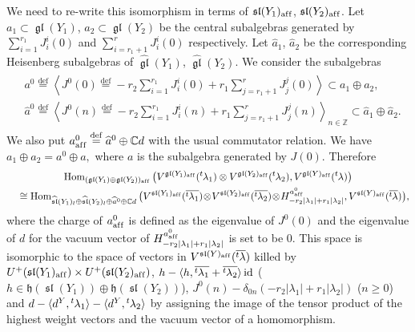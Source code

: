\documentclass[pdftex]{sigma}
\theoremstyle{definition}
\numberwithin{equation}{section}
\newcommand{\lsp}[2]{{\mskip-.3mu}{}^{#1}\mskip-1mu{#2}}
\newcommand{\defeq}{\overset{\operatorname{\scriptstyle def}}{=}}
\newcommand{\C}{{\mathbb C}}
\newcommand{\Z}{{\mathbb Z}}
\newcommand{\algsl}{\operatorname{\mathfrak{sl}}} %
\newcommand{\gl}{\operatorname{\mathfrak{gl}}}
\newcommand{\Hom}{\operatorname{Hom}}
\newcommand{\id}{\operatorname{id}}
\newcommand{\aff}{\mathrm{af\/f}}
\begin{document}
We need to re-write this isomorphism in terms of $\algsl(Y_1)_\aff$,
$\algsl(Y_2)_\aff$.
%
Let ${a}_1\subset{\gl}(Y_1)$, ${a}_2\subset{\gl}(Y_2)$ be the
central subalgebras generated by
\(
   \sum_{i=1}^{r_1} J_i^i(0)
\)
and
\(
   \sum_{i=r_1+1}^{r} J_i^i(0)
\)
respectively. Let $\widehat{a}_1$, $\widehat{a}_2$ be the
corresponding Heisenberg subalgebras of
$\widehat{\gl}(Y_1)$, $\widehat{\gl}(Y_2)$.
%
We consider the subalgebras
{\allowdisplaybreaks
\begin{gather*}
\begin{split}
  & {a}^0   \defeq
  \left\langle J^0(0) \defeq - r_2 \sum_{i=1}^{r_1} J_i^i(0)
   + r_1 \sum_{j=r_1+1}^{r} J_j^j(0)\right\rangle
  \subset
  {a}_1\oplus {a}_2,
\\
 & \widehat{a}^0  \defeq
  \left\langle J^0(n) \defeq - r_2 \sum_{i=1}^{r_1} J_i^i(n)
   + r_1 \sum_{j=r_1+1}^{r} J_j^j(n) \right\rangle_{n\in\Z}
  \subset
  \widehat{a}_1\oplus \widehat{a}_2.
\end{split}
\end{gather*}
We} also put $a^0_\aff \defeq \widehat a^0\oplus \C d$ with the usual
commutator relation.
%
We have
\(
  {a}_1\oplus {a}_2 = {a}^0 \oplus {a},
\)
where $a$ is the subalgebra generated by $J(0)$.
%
Therefore
\begin{gather}\label{eq:homsp}
     \Hom_{({\gl}(Y_1)\oplus{\gl}(Y_2))_\aff}
  \big(V^{{\gl}(Y_1)_\aff}(\lsp{t}\lambda_1)
  \otimes V^{{\gl}(Y_2)_\aff}(\lsp{t}\lambda_2),
  V^{{\gl}(Y)_\aff}(\lsp{t}\lambda)\big)
\\
 \quad{} \cong
  \Hom_{\widehat{\algsl}(Y_1)_l\oplus\widehat{\algsl}(Y_2)_l\oplus
    \widehat{a}^0 \oplus \C d}
  \big(V^{{\algsl}(Y_1)_\aff}(\overline{\lsp{t}\lambda_1})
  \!\otimes\! V^{{\algsl}(Y_2)_\aff}(\overline{\lsp{t}\lambda_2})
  \!\otimes\! H^{{a}^0_\aff}_{-r_2|\lambda_1|+r_1|\lambda_2|},
  V^{{\algsl}(Y)_\aff}(\overline{\lsp{t}\lambda})\big),
\nonumber
\end{gather}
where the charge of ${a}^0_\aff$ is def\/ined as the eigenvalue of
\(
  J^0(0)
\)
and the eigenvalue of $d$ for the vacuum vector of
$H^{{a}^0_\aff}_{-r_2|\lambda_1|+r_1|\lambda_2|}$ is set to be $0$.
%
This space is isomorphic to the space of vectors in
$V^{\algsl(Y)_\aff}(\overline{\lsp{t}\lambda})$ killed by
$U^+({\algsl}(Y_1)_\aff)\times U^+({\algsl}(Y_2)_\aff)$,
\(
   h
   - \langle h,
   \overline{\lsp{t}\lambda_1}+\overline{\lsp{t}\lambda_2}
   \rangle\id
\)
($h\in \mathfrak h(\algsl(Y_1))\oplus\mathfrak h(\algsl(Y_2))$),
$J^0(n) - \delta_{0n} (-r_2|\lambda_1|+r_1|\lambda_2|)$
($n\ge 0$) and
\(
  d - \langle d^Y, \lsp{t}\lambda_1\rangle
    - \langle d^Y, \lsp{t}\lambda_2\rangle
\)
by assigning the image of the tensor product of the highest weight vectors
and the vacuum vector of a homomorphism.
\end{document}
